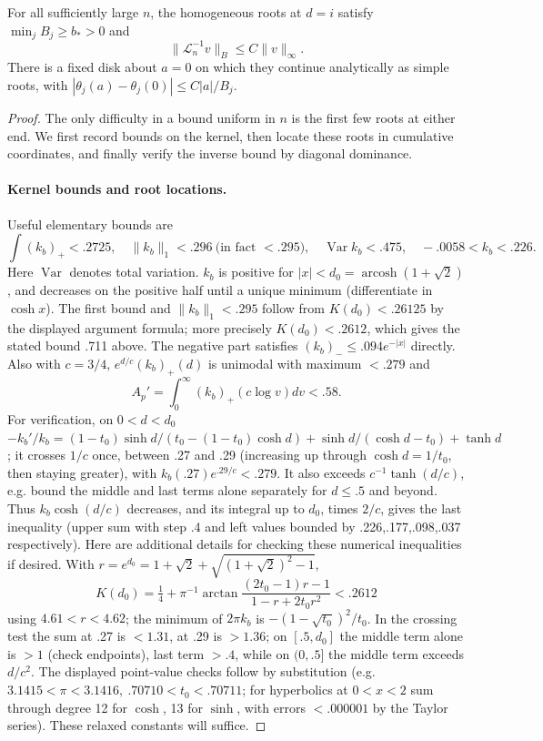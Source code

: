 \begin{lemma}
\label{L:lem:pressure-root-continuation}
For all sufficiently large $n$, the homogeneous roots at $d=i$ satisfy
$\min_jB_j\ge b_*>0$ and
\[
 \|\mathcal L_n^{-1}v\|_B\le C\|v\|_\infty.
\]
There is a fixed disk about $a=0$ on which they continue analytically
as simple roots, with
$|\theta_j(a)-\theta_j(0)|\le C|a|/B_j$.
\end{lemma}
\begin{proof}
The only difficulty in a bound uniform in $n$ is the first few roots
at either end. We first record bounds on the kernel, then locate these
roots in cumulative coordinates, and finally verify the inverse bound
by diagonal dominance.

\paragraph{Kernel bounds and root locations.}
Useful elementary bounds are
\[
 \int(k_b)_+<.2725,\quad\|k_b\|_1<.296\ \text{(in fact }<.295),\quad
 \operatorname{Var} k_b<.475,\quad -.0058<k_b<.226.
\]
Here \(\operatorname{Var}\) denotes total variation. \(k_b\) is positive for \(|x|<d_0=\operatorname{arcosh}(1+\sqrt2)\), and decreases on the positive half until a unique minimum (differentiate in \(\cosh x\)). The first bound and \(\|k_b\|_1<.295\) follow from \(K(d_0)<.26125\) by the displayed argument formula; more precisely \(K(d_0)<.2612\), which gives the stated bound .711 above. The negative part satisfies \((k_b)_-\le .094 e^{-|x|}\) directly. Also with \(c=3/4\), \(e^{d/c}(k_b)_+(d)\) is unimodal with maximum \(<.279\) and
\[
 A_p'=\int_0^\infty(k_b)_+(c\log v)dv<.58 .
\]
For verification, on \(0<d<d_0\)
\(-k_b'/k_b=(1-t_0)\sinh d/(t_0-(1-t_0)\cosh d)+\sinh d/(\cosh d-t_0)+\tanh d\); it crosses \(1/c\) once, between .27 and .29 (increasing up through \(\cosh d=1/t_0\), then staying greater), with \(k_b(.27)e^{.29/c}<.279\). It also exceeds \(c^{-1}\tanh(d/c)\), e.g. bound the middle and last terms alone separately for \(d\le .5\) and beyond. Thus \(k_b\cosh(d/c)\) decreases, and its integral up to \(d_0\), times \(2/c\), gives the last inequality (upper sum with step .4 and left values bounded by .226,.177,.098,.037 respectively). Here are additional details for checking these numerical inequalities if desired. With \(r=e^{d_0}=1+\sqrt2+\sqrt{(1+\sqrt2)^2-1}\),
\[
 K(d_0)=\tfrac14+\pi^{-1}\arctan\frac{(2t_0-1)r-1}{1-r+2t_0 r^2}<.2612
\]
using \(4.61<r<4.62\); the minimum of \(2\pi k_b\) is \(-(1-\sqrt{t_0})^2/t_0\). In the crossing test the sum at .27 is \(<1.31\), at .29 is \(>1.36\); on \([.5,d_0]\) the middle term alone is \(>1\) (check endpoints), last term \(>.4\), while on \((0,.5]\) the middle term exceeds \(d/c^2\). The displayed point-value checks follow by substitution (e.g. \(3.1415<\pi<3.1416,\ .70710<t_0<.70711\); for hyperbolics at \(0<x<2\) sum through degree 12 for \(\cosh\), 13 for \(\sinh\), with errors \(<.000001\) by the Taylor series). These relaxed constants will suffice.


\end{proof}

